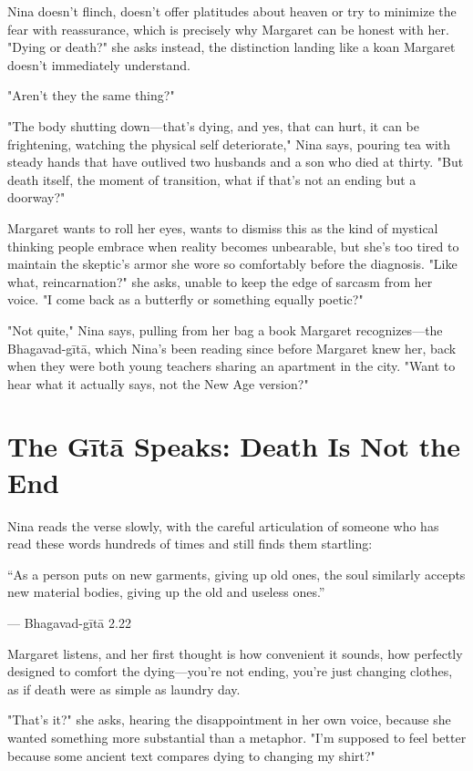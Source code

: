 \documentclass[11pt,twoside]{book}
\begin{document}
Nina doesn't flinch, doesn't offer platitudes about heaven or try to minimize the fear with reassurance, which is precisely why Margaret can be honest with her. "Dying or death?" she asks instead, the distinction landing like a koan Margaret doesn't immediately understand.

"Aren't they the same thing?"

"The body shutting down—that's dying, and yes, that can hurt, it can be frightening, watching the physical self deteriorate," Nina says, pouring tea with steady hands that have outlived two husbands and a son who died at thirty. "But death itself, the moment of transition, what if that's not an ending but a doorway?"

Margaret wants to roll her eyes, wants to dismiss this as the kind of mystical thinking people embrace when reality becomes unbearable, but she's too tired to maintain the skeptic's armor she wore so comfortably before the diagnosis. "Like what, reincarnation?" she asks, unable to keep the edge of sarcasm from her voice. "I come back as a butterfly or something equally poetic?"

"Not quite," Nina says, pulling from her bag a book Margaret recognizes—the Bhagavad-gītā, which Nina's been reading since before Margaret knew her, back when they were both young teachers sharing an apartment in the city. "Want to hear what it actually says, not the New Age version?"

\section*{The Gītā Speaks: Death Is Not the End}

Nina reads the verse slowly, with the careful articulation of someone who has read these words hundreds of times and still finds them startling:

\begin{pullquote}
``As a person puts on new garments, giving up old ones, the soul similarly accepts new material bodies, giving up the old and useless ones.''

--- Bhagavad-gītā 2.22
\end{pullquote}

Margaret listens, and her first thought is how convenient it sounds, how perfectly designed to comfort the dying—you're not ending, you're just changing clothes, as if death were as simple as laundry day.

"That's it?" she asks, hearing the disappointment in her own voice, because she wanted something more substantial than a metaphor. "I'm supposed to feel better because some ancient text compares dying to changing my shirt?"
\end{document}
